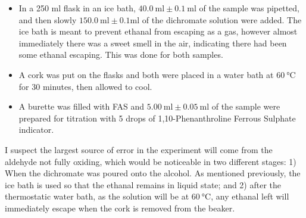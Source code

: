 \begin{itemize}
	\item In a 250 ml flask in an ice bath, $\SI{40.0}{\milli\litre} \pm \SI{0.1}{\milli\litre}$ of the sample was pipetted, and then slowly $\SI{150.0}{\milli\litre} \pm 0.1 \si{\milli\litre}$ of the dichromate solution were added. The ice bath is meant to prevent ethanal from escaping as a gas, however almost immediately there was a sweet smell in the air, indicating there had been some ethanal escaping. This was done for both samples.
	\item A cork was put on the flasks and both were placed in a water bath at $\SI{60}{\celsius}$ for 30 minutes, then allowed to cool.
	\item A burette was filled with FAS and $\SI{5.00}{\milli\litre} \pm \SI{0.05}{\milli\litre}$ of the sample were prepared for titration with 5 drops of 1,10-Phenanthroline Ferrous Sulphate indicator.
\end{itemize}

I suspect the largest source of error in the experiment will come from the aldehyde not fully oxiding, which would be noticeable in two different stages: 1) When the dichromate was poured onto the alcohol. As mentioned previously, the ice bath is used so that the ethanal remains in liquid state; and 2) after the thermostatic water bath, as the solution will be at $\SI{60}{\celsius}$, any ethanal left will immediately escape when the cork is removed from the beaker.